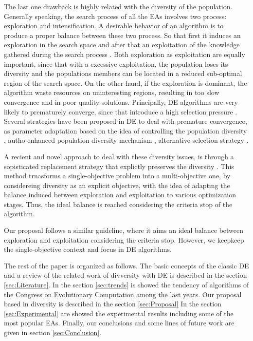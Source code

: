 %
The last one drawback is highly related with the diversity of the population.
%
Generally speaking, the search process of all the EAs involves two process: exploration and intensification.
%
A desirable behavior of an algorithm is to produce a proper balance between these two process.
%
So that first it induces an exploration in the search space and after that an exploitation of the knowledge gathered during the search process \cite{zaharie2003control}.
%
Both exploration as exploitation are equally important, since that with a excessive exploitation, the population loses its diversity and the populations members can be located in a reduced sub-optimal region of the search space.
%
On the other hand, if the exploration is dominant, the algorithm waste resources on uninteresting regions, resulting in too slow convergence and in poor quality-solutions.
%
Principally, DE algorithms are very likely to prematurely converge, since that introduce a high selection pressure \cite{sa2008exploration}.
%
Several strategies have been proposed in DE to deal with premature convergence, as parameter adaptation based on the idea of controlling the population diversity \cite{zaharie2003control}, autho-enhanced population diversity mechanism \cite{yang2015differential}, alternative selection strategy \cite{sa2008exploration}.


A recient and novel approach to deal with these diversity issues, is through a sopisticated replacement strategy that explictly preserves the diversity \cite{segura2016novel}.
%
This method trnasforms a single-objective problem into a multi-objective one, by considereing diversity as an explicit objective, with the idea of adapting the balance induced between exploration and exploitation to various optimization stages.
%
Thus, the ideal balance is reached considering the criteria stop of the algorithm.
%

Our proposal follows a similar guideline, where it aims an ideal balance between exploration and exploitation considering the criteria stop.
%
However, we keepkeep the single-objective context and focus in DE algorithms.



The rest of the paper is organized as follows.
%
The basic concepts of the classic DE and a review of the related work of divversity with DE is described in the section \ref{sec:Literature}.
%
In the section \ref{sec:trends} is showed the tendency of algorithms of the Congress on Evolutionary Computation among the last years.
%
Our proposal based in diversity is described in the section \ref{sec:Proposal}
%
In the section \ref{sec:Experimental} are showed the experimental results including some of the most popular EAs.
%
Finally, our conclusions and some lines of future work are given in section \ref{sec:Conclusion}.
